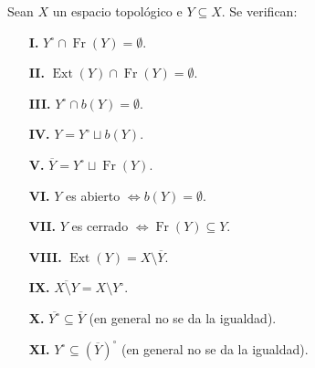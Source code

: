 \begin{propi}
Sean $X$ un espacio topológico e $Y \subseteq X$. Se verifican:
\begin{enumerate}
    \item[\textbf{I.}] $Y^\circ \cap \operatorname{Fr}(Y) = \emptyset$.
    \item[\textbf{II.}] $\operatorname{Ext}(Y) \cap \operatorname{Fr}(Y) = \emptyset$.
    \item[\textbf{III.}] $Y^\circ \cap b(Y) = \emptyset$.
    \item[\textbf{IV.}] $Y = Y^\circ \sqcup b(Y)$.
    \item[\textbf{V.}] $\overline{Y} = Y^\circ \sqcup \operatorname{Fr}(Y)$.
    \item[\textbf{VI.}] $Y$ es abierto $\iff b(Y) = \emptyset$.
    \item[\textbf{VII.}] $Y$ es cerrado $\iff \operatorname{Fr}(Y) \subseteq Y$.
    \item[\textbf{VIII.}] $\operatorname{Ext}(Y) = X \setminus \overline{Y}$.
    \item[\textbf{IX.}] $\overline{X \setminus Y} = X \setminus Y^\circ$.
    \item[\textbf{X.}] $\overline{Y^\circ} \subseteq \overline{Y}$ (en general no se da la igualdad).
    \item[\textbf{XI.}] $Y^\circ \subseteq (\overline{Y})^\circ$ (en general no se da la igualdad).
\end{enumerate}
\end{propi}

